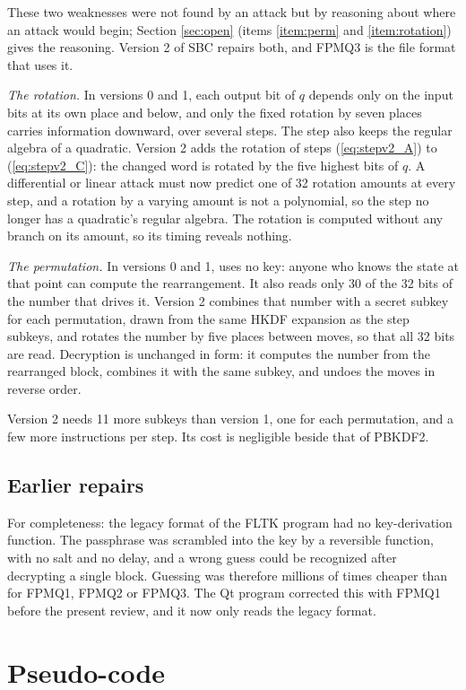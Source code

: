 These two weaknesses were not found by an attack but by reasoning about where an
attack would begin; Section \ref{sec:open} (items \ref{item:perm} and
\ref{item:rotation}) gives the reasoning. Version 2 of SBC repairs both, and
FPMQ3 is the file format that uses it.

\emph{The rotation.} In versions 0 and 1, each output bit of $q$ depends only on
the input bits at its own place and below, and only the fixed rotation by seven
places carries information downward, over several steps. The step also keeps
the regular algebra of a quadratic. Version 2 adds the rotation of steps
(\ref{eq:stepv2_A}) to (\ref{eq:stepv2_C}): the changed word is rotated by the
five highest bits of $q$. A differential or linear attack must now predict one
of 32 rotation amounts at every step, and a rotation by a varying amount is not
a polynomial, so the step no longer has a quadratic's regular algebra. The
rotation is computed without any branch on its amount, so its timing reveals
nothing.

\emph{The permutation.} In versions 0 and 1,  uses no key: anyone who
knows the state at that point can compute the rearrangement. It also reads only
30 of the 32 bits of the number that drives it. Version 2 combines that number
with a secret subkey for each permutation, drawn from the same HKDF expansion as
the step subkeys, and rotates the number by five places between moves, so that
all 32 bits are read. Decryption is unchanged in form: it computes the number
from the rearranged block, combines it with the same subkey, and undoes the
moves in reverse order.

Version 2 needs 11 more subkeys than version 1, one for each permutation, and a
few more instructions per step. Its cost is negligible beside that of PBKDF2.

\subsection{Earlier repairs}

For completeness: the legacy format of the FLTK program had no key-derivation
function. The passphrase was scrambled into the key by a reversible function,
with no salt and no delay, and a wrong guess could be recognized after
decrypting a single block. Guessing was therefore millions of times cheaper
than for FPMQ1, FPMQ2 or FPMQ3. The Qt program corrected this with FPMQ1 before the
present review, and it now only reads the legacy format.

\section{Pseudo-code}
\label{sec:pseudo}

